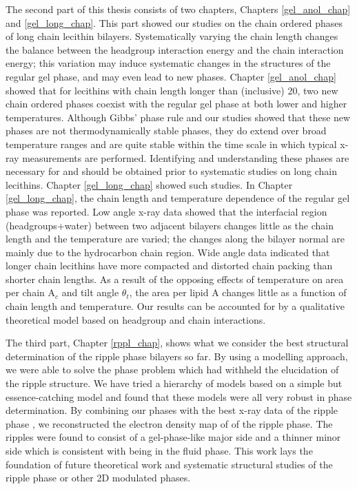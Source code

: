 The second part of this thesis consists of two chapters, Chapters 
\ref{gel_anol_chap} and \ref{gel_long_chap}. This part showed our
studies on the chain ordered phases of long chain lecithin bilayers.
Systematically varying the chain length changes the balance between the 
headgroup interaction energy and the chain interaction energy; this variation
may induce systematic changes in the structures of the regular gel phase,
and may even lead to new phases. Chapter \ref{gel_anol_chap} showed that
for lecithins with chain length longer than (inclusive) 20, two new
chain ordered phases coexist with the regular gel phase at both lower
and higher temperatures. Although Gibbs' phase rule and our studies
showed that these new phases are not thermodynamically stable phases,
they do extend over broad temperature ranges and are quite stable
within the time scale in which typical x-ray measurements are
performed. Identifying and understanding these phases are necessary for
and should be obtained prior to systematic studies on long chain lecithins.
Chapter \ref{gel_long_chap} showed such studies. In Chapter 
\ref{gel_long_chap}, the chain length and temperature dependence of
the regular gel phase was reported. Low angle x-ray data showed that
the interfacial region (headgroups+water) between two adjacent bilayers 
changes little as the chain length and the temperature are varied; the
changes along the bilayer normal are mainly due to the hydrocarbon
chain region. Wide angle data indicated that longer chain lecithins
have more compacted and distorted chain packing than shorter chain lengths.
As a result of the opposing effects of temperature on area per chain A$_c$
and tilt angle $\theta_t$, the area per lipid A changes little as
a function of chain length and temperature. Our results can be accounted
for by a qualitative theoretical model based on headgroup and chain
interactions.

The third part, Chapter \ref{rppl_chap}, shows what we consider
the best structural determination of the ripple phase bilayers so far. 
By using a modelling approach, we were able to solve the phase problem
which had withheld the elucidation of the ripple structure. We have
tried a hierarchy of models based on a simple but essence-catching model
and found that these models were all very robust in phase determination.
By combining our phases with the best x-ray data of the ripple phase 
\cite{Wac89a}, we reconstructed the electron density map of of the 
ripple phase. The ripples were found to consist of a gel-phase-like
major side and a thinner minor side which is consistent with being
in the fluid phase. This work lays the foundation of future theoretical
work and systematic structural studies of the ripple phase or other
2D modulated phases.

